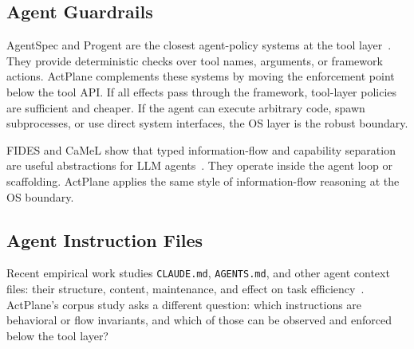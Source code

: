 \subsection{Agent Guardrails}

AgentSpec and Progent are the closest agent-policy systems at the tool
layer~\cite{wang2025agentspec,shi2025progent}. They provide deterministic
checks over tool names, arguments, or framework actions. ActPlane complements these systems by
moving the enforcement point below the tool API. If all effects pass through the
framework, tool-layer policies are sufficient and cheaper. If the agent can
execute arbitrary code, spawn subprocesses, or use direct system interfaces, the
OS layer is the robust boundary.

FIDES and CaMeL show that typed information-flow and capability separation are
useful abstractions for LLM agents~\cite{costa2025fides,debenedetti2025camel}. They operate
inside the agent loop or scaffolding. ActPlane applies the same style of
information-flow reasoning at the OS boundary.

\subsection{Agent Instruction Files}

Recent empirical work studies \texttt{CLAUDE.md}, \texttt{AGENTS.md}, and other
agent context files: their structure, content, maintenance, and effect on task
efficiency~\cite{chatlatanagulchai2025manifests,chatlatanagulchai2025agentreadmes,
santos2025claudeconfig,lulla2026agentsmd}. ActPlane's corpus study asks a
different question: which instructions are behavioral or flow invariants, and
which of those can be observed and enforced below the tool layer?
